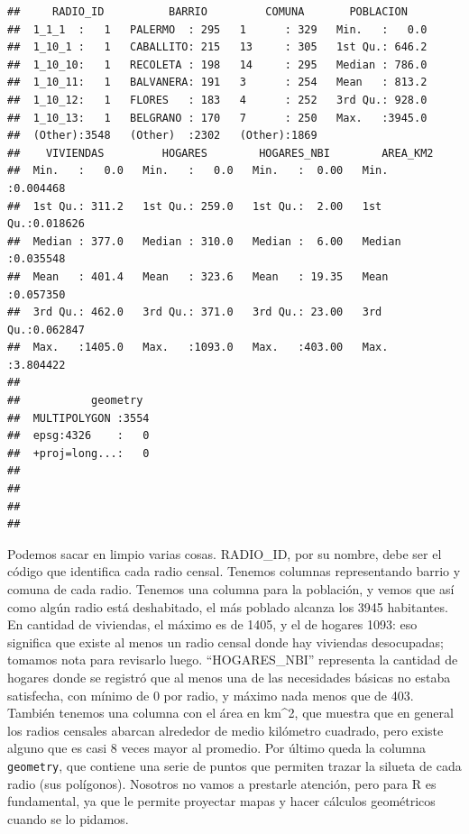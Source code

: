 \documentclass[]{book}
\begin{document}
\begin{verbatim}
##     RADIO_ID          BARRIO         COMUNA       POBLACION     
##  1_1_1  :   1   PALERMO  : 295   1      : 329   Min.   :   0.0  
##  1_10_1 :   1   CABALLITO: 215   13     : 305   1st Qu.: 646.2  
##  1_10_10:   1   RECOLETA : 198   14     : 295   Median : 786.0  
##  1_10_11:   1   BALVANERA: 191   3      : 254   Mean   : 813.2  
##  1_10_12:   1   FLORES   : 183   4      : 252   3rd Qu.: 928.0  
##  1_10_13:   1   BELGRANO : 170   7      : 250   Max.   :3945.0  
##  (Other):3548   (Other)  :2302   (Other):1869                   
##    VIVIENDAS         HOGARES        HOGARES_NBI        AREA_KM2       
##  Min.   :   0.0   Min.   :   0.0   Min.   :  0.00   Min.   :0.004468  
##  1st Qu.: 311.2   1st Qu.: 259.0   1st Qu.:  2.00   1st Qu.:0.018626  
##  Median : 377.0   Median : 310.0   Median :  6.00   Median :0.035548  
##  Mean   : 401.4   Mean   : 323.6   Mean   : 19.35   Mean   :0.057350  
##  3rd Qu.: 462.0   3rd Qu.: 371.0   3rd Qu.: 23.00   3rd Qu.:0.062847  
##  Max.   :1405.0   Max.   :1093.0   Max.   :403.00   Max.   :3.804422  
##                                                                       
##           geometry   
##  MULTIPOLYGON :3554  
##  epsg:4326    :   0  
##  +proj=long...:   0  
##                      
##                      
##                      
## 
\end{verbatim}

Podemos sacar en limpio varias cosas. RADIO\_ID, por su nombre, debe ser
el código que identifica cada radio censal. Tenemos columnas
representando barrio y comuna de cada radio. Tenemos una columna para la
población, y vemos que así como algún radio está deshabitado, el más
poblado alcanza los 3945 habitantes. En cantidad de viviendas, el máximo
es de 1405, y el de hogares 1093: eso significa que existe al menos un
radio censal donde hay viviendas desocupadas; tomamos nota para
revisarlo luego. ``HOGARES\_NBI'' representa la cantidad de hogares
donde se registró que al menos una de las necesidades básicas no estaba
satisfecha, con mínimo de 0 por radio, y máximo nada menos que de 403.
También tenemos una columna con el área en km\^{}2, que muestra que en
general los radios censales abarcan alrededor de medio kilómetro
cuadrado, pero existe alguno que es casi 8 veces mayor al promedio. Por
último queda la columna \texttt{geometry}, que contiene una serie de
puntos que permiten trazar la silueta de cada radio (sus polígonos).
Nosotros no vamos a prestarle atención, pero para R es fundamental, ya
que le permite proyectar mapas y hacer cálculos geométricos cuando se lo
pidamos.
\end{document}

